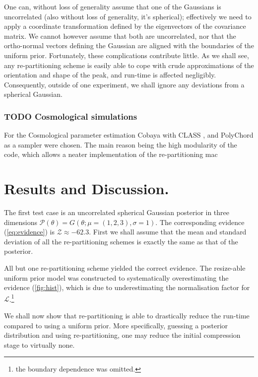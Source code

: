 \documentclass[usenatbib]{mnras}
\begin{document}
One can, without loss of generality assume that one of the
Gaussians is uncorrelated (also without loss of generality, it's
spherical); effectively we need to apply a coordinate
transformation defined by the eigenvectors of the covariance
matrix. We cannot however assume that both are uncorrelated, nor
that the ortho-normal vectors defining the Gaussian are aligned
with the boundaries of the uniform prior. Fortunately, these
complications contribute little. As we shall see, any
re-partitioning scheme is easily able to cope with crude
approximations of the orientation and shape of the peak, and
run-time is affected negligibly. Consequently, outside of one
experiment, we shall ignore any deviations from a spherical
Gaussian.





\subsubsection{{\bfseries\sffamily TODO} Cosmological simulations}
\label{sec:org8235536}
For the Cosmological parameter estimation Cobaya \citep{cobaya} with
CLASS \citep{Blas_2011}, and PolyChord \citep{polychord} as a sampler
were chosen. The main reason being the high modularity of the code,
which allows a neater implementation of the re-partitioning
mac
\section{Results and Discussion.}
\label{sec:orgbc26fda}
The first test case is an uncorrelated spherical Gaussian posterior
in three dimensions \(\mathcal{P}(\theta) = G(\theta; \mu = (1,2,3),
  \sigma = 1)\). The corresponding evidence (\autoref{eq:evidence}) is
\(\mathcal{Z}\approx-62.3\). First we shall assume that the mean and
standard deviation of all the re-partitioning schemes is exactly the
same as that of the posterior. 

All but one re-partitioning scheme yielded the correct
evidence. The resize-able uniform prior model was constructed to
systematically overestimating the evidence (\autoref{fig:hist}),
which is due to underestimating the normalisation factor for
\(\mathcal{L}\).\footnote{the boundary dependence was omitted.}


We shall now show that re-partitioning is able to drastically reduce
the run-time compared to using a uniform prior. More specifically,
guessing a posterior distribution and using re-partitioning, one may
reduce the initial compression stage to virtually none.
\end{document}
